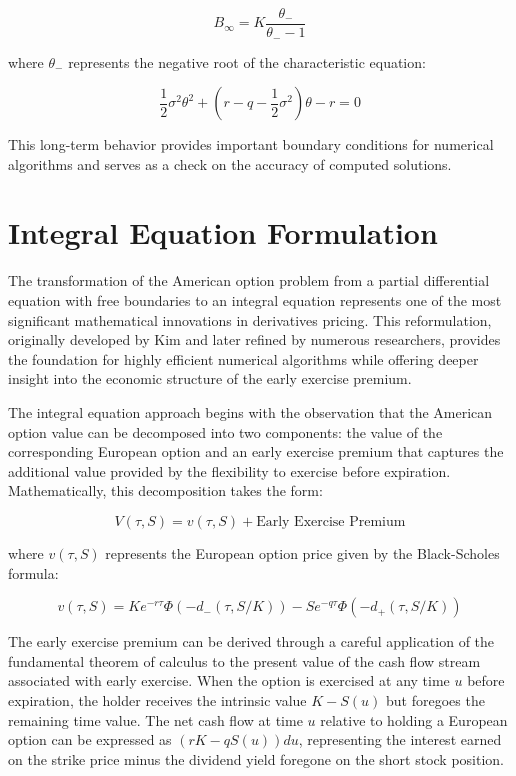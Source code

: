 \documentclass[
  american,
  11pt,
  11pt,
  letterpaper,
  onecolumn]{article}
\begin{document}
\[B_\infty = K \frac{\theta_-}{\theta_- - 1}\]

where \(\theta_-\) represents the negative root of the characteristic
equation:

\[\frac{1}{2}\sigma^2 \theta^2 + (r-q-\frac{1}{2}\sigma^2)\theta - r = 0\]

This long-term behavior provides important boundary conditions for
numerical algorithms and serves as a check on the accuracy of computed
solutions.

\section{Integral Equation
Formulation}\label{integral-equation-formulation}

The transformation of the American option problem from a partial
differential equation with free boundaries to an integral equation
represents one of the most significant mathematical innovations in
derivatives pricing. This reformulation, originally developed by Kim and
later refined by numerous researchers, provides the foundation for
highly efficient numerical algorithms while offering deeper insight into
the economic structure of the early exercise premium.

The integral equation approach begins with the observation that the
American option value can be decomposed into two components: the value
of the corresponding European option and an early exercise premium that
captures the additional value provided by the flexibility to exercise
before expiration. Mathematically, this decomposition takes the form:

\[V(\tau,S) = v(\tau,S) + \text{Early Exercise Premium}\]

where \(v(\tau,S)\) represents the European option price given by the
Black-Scholes formula:

\[v(\tau,S) = K e^{-r\tau}\Phi(-d_-(\tau,S/K)) - S e^{-q\tau}\Phi(-d_+(\tau,S/K))\]

The early exercise premium can be derived through a careful application
of the fundamental theorem of calculus to the present value of the cash
flow stream associated with early exercise. When the option is exercised
at any time \(u\) before expiration, the holder receives the intrinsic
value \(K - S(u)\) but foregoes the remaining time value. The net cash
flow at time \(u\) relative to holding a European option can be
expressed as \((rK - qS(u))du\), representing the interest earned on the
strike price minus the dividend yield foregone on the short stock
position.
\end{document}
